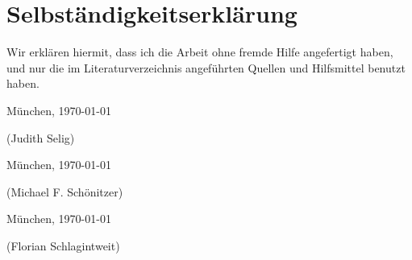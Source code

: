 
\section*{Selbständigkeitserklärung}

Wir erklären hiermit, dass ich die Arbeit ohne fremde Hilfe
angefertigt haben, und nur die im Literaturverzeichnis angeführten
Quellen und Hilfsmittel benutzt haben.

\vspace{1cm}\noindent
München, \today \quad
\begin{minipage}[t]{6cm} %
\dotfill
\begin{center}
\small (Judith Selig)
\end{center}
\end{minipage}

\bigskip

\vspace{1cm}\noindent
München, \today \quad
\begin{minipage}[t]{6cm} %
\dotfill
\begin{center}
\small (Michael F. Schönitzer)
\end{center}
\end{minipage}

\bigskip

\vspace{1cm}\noindent
München, \today \quad
\begin{minipage}[t]{6cm} %
\dotfill
\begin{center}
\small (Florian Schlagintweit)
\end{center}
\end{minipage}